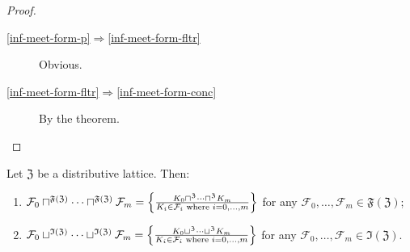 \begin{proof}
~
\begin{description}
\item [{\ref{inf-meet-form-p}$\Rightarrow$\ref{inf-meet-form-fltr}}] Obvious.
\item [{\ref{inf-meet-form-fltr}$\Rightarrow$\ref{inf-meet-form-conc}}] By
the theorem.
\end{description}
\end{proof}
\begin{thm}
Let $\mathfrak{Z}$ be a distributive lattice. Then:
\begin{enumerate}
\item $\mathcal{F}_{0}\sqcap^{\mathfrak{F}(\mathfrak{Z})}\dots\sqcap^{\mathfrak{F}(\mathfrak{Z})}\mathcal{F}_{m}=\left\{ \frac{K_{0}\sqcap^{\mathfrak{Z}}\dots\sqcap^{\mathfrak{Z}}K_{m}}{K_{i}\in\mathcal{F}_{i}\text{ where }i=0,\dots,m}\right\}$
for any $\mathcal{F}_{0},\dots,\mathcal{F}_{m}\in\mathfrak{F}(\mathfrak{Z})$;
\item $\mathcal{F}_{0}\sqcup^{\mathfrak{I}(\mathfrak{Z})}\dots\sqcup^{\mathfrak{I}(\mathfrak{Z})}\mathcal{F}_{m}=\left\{ \frac{K_{0}\sqcup^{\mathfrak{Z}}\dots\sqcup^{\mathfrak{Z}}K_{m}}{K_{i}\in\mathcal{F}_{i}\text{ where }i=0,\dots,m}\right\}$
for any $\mathcal{F}_{0},\dots,\mathcal{F}_{m}\in\mathfrak{I}(\mathfrak{Z})$.
\end{enumerate}
\end{thm}
